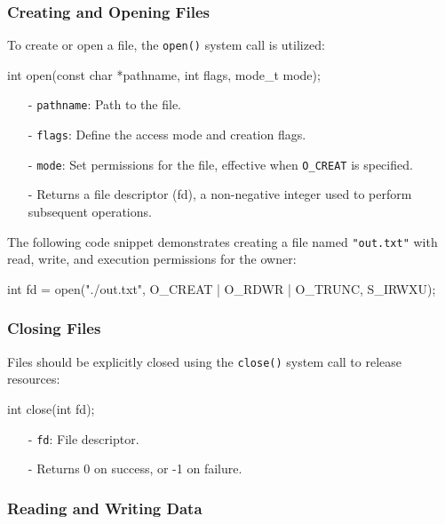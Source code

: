 \subsubsection{Creating and Opening Files}
To create or open a file, the \texttt{open()} system call is utilized:
\begin{cc}
int open(const char *pathname, int flags, mode_t mode);
\end{cc}
\begin{itemize}[itemsep=3pt, topsep=3pt]
  \item[-] \texttt{pathname}: Path to the file.
  \item[-] \texttt{flags}: Define the access mode and creation flags.
  \item[-] \texttt{mode}: Set permissions for the file, effective when \texttt{O\_CREAT} is specified.
  \item[-] Returns a file descriptor (fd), a non-negative integer used to perform subsequent operations.
\end{itemize}

\begin{example}
The following code snippet demonstrates creating a file named \texttt{"out.txt"} with read, write, and execution permissions for the owner:
\begin{cc}
int fd = open("./out.txt", O_CREAT | O_RDWR | O_TRUNC, S_IRWXU);
\end{cc}
\end{example}

\subsubsection{Closing Files}

Files should be explicitly closed using the \texttt{close()} system call to release resources:

\begin{cc}
int close(int fd);
\end{cc}
\begin{itemize}[itemsep=2pt, topsep=1pt]
  \item[-] \texttt{fd}: File descriptor.
  \item[-] Returns 0 on success, or -1 on failure.
\end{itemize}

\subsubsection{Reading and Writing Data}

